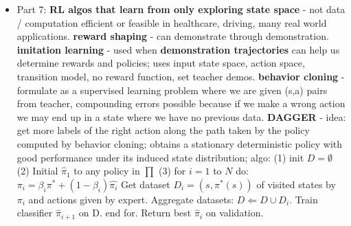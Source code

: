 \documentclass{article}
\begin{document}
\begin{itemize}
\item Part 7: \textbf{RL algos that learn from only exploring state space} - not data / computation efficient or feasible in healthcare, driving, many real world applications. \textbf{reward shaping} - can demonstrate through demonstration. \textbf{imitation learning} - used when \textbf{demonstration trajectories} can help us determine rewards and policies; uses input state space, action space, transition model, no reward function, set teacher demos. \textbf{behavior cloning} - formulate as a supervised learning problem where we are given (s,a) pairs from teacher, compounding errors possible because if we make a wrong action we may end up in a state where we have no previous data. \textbf{DAGGER} - idea: get more labels of the right action along the path taken by the policy computed by behavior cloning; obtains a stationary deterministic policy with good performance under its induced state distribution; algo: (1) init $D = \emptyset$ (2) Initial $\hat{\pi}_1$ to any policy in $\prod$ (3) for $i = 1$ to $N$ do: $\pi_i = \beta_i \pi^* + (1-\beta_i)\hat{\pi_i}$ Get dataset $D_i = {(s, \pi^*(s))}$ of visited states by $\pi_i$ and actions given by expert. Aggregate datasets: $ D \Leftarrow D \cup D_i$. Train classifier $\hat{\pi}_{i+1}$ on D. end for. Return best $\hat{\pi}_i$ on validation.
\end{itemize}
\end{document}

